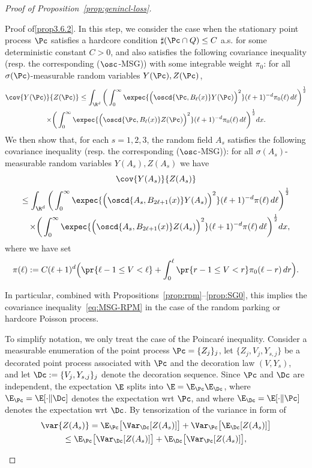 \begin{proof}[Proof of Proposition~\ref{prop:genincl-loss}]
\begin{step}{Proof of\eqref{prop3.6.2}.}\label{step2proofprop3.6}
In this step, we consider the case when the stationary point process $\Pc$ satisfies a hardcore condition $\sharp(\Pc\cap Q)\le C$ a.s. for some deterministic constant $C>0$, and also satisfies the following covariance inequality (resp. the corresponding ($\osc$-MSG)) with some integrable weight $\pi_0$: for all $\sigma(\Pc)$-measurable random variables $Y(\Pc),Z(\Pc)$,
\begin{multline}\label{eq:ass-ci-pc}
\cov{Y(\Pc)}{Z(\Pc)}\le \int_{\R^d}\bigg(\int_0^\infty\expec{\Big(\oscd{\Pc,B_{\ell}(x)}Y(\Pc)\Big)^2}(\ell+1)^{-d}\pi_0(\ell)\,d\ell\bigg)^\frac12\\
\times\bigg(\int_0^\infty\expec{\Big(\oscd{\Pc,B_{\ell}(x)}Z(\Pc)\Big)^2}(\ell+1)^{-d}\pi_0(\ell)\,d\ell\bigg)^\frac12dx.
\end{multline}
We then show that, for each $s=1,2,3$, the random field $A_s$ satisfies the following covariance inequality (resp. the corresponding ($\osc$-MSG)): for all $\sigma(A_s)$-measurable random variables $Y(A_s),Z(A_s)$ we have
\begin{multline}\label{eq:res-RPM-type-cov}
\cov{Y(A_s)}{Z(A_s)}\\
\begin{aligned}
\le \int_{\R^d}\bigg(\int_0^\infty\expec{\Big(\oscd{A_s,B_{2\ell+1}(x)}Y(A_s)\Big)^2}(\ell+1)^{-d}\pi(\ell)\,d\ell\bigg)^\frac12\\
\times\bigg(\int_0^\infty\expec{\Big(\oscd{A_s,B_{2\ell+1}(x)}Z(A_s)\Big)^2}(\ell+1)^{-d}\pi(\ell)\,d\ell\bigg)^\frac12dx,
\end{aligned}
\end{multline}
where we have set
\[
\pi(\ell):=C(\ell+1)^d\Big(\pr{\ell-1\le V<\ell}+\int_0^\ell \pr{r-1\le V<r}\pi_0(\ell-r)\,dr\Big).
\]


In particular, combined with Propositions~\ref{prop:rpm}--\ref{prop:SG0}, this implies the covariance inequality~\eqref{eq:MSG-RPM} in the case of the random parking or hardcore Poisson process.

\noindent To simplify notation, we only treat the case of the Poincaré inequality. Consider a measurable enumeration of the point process $\Pc=\{Z_j\}_j$, let $\{Z_j,V_j,Y_{s,j}\}$ be a decorated point process associated with $\Pc$ and the decoration law $(V,Y_s)$, and let $\Dc:=\{V_j,Y_{s,j}\}_j$ denote the decoration sequence. Since $\Pc$ and $\Dc$ are independent, the expectation $\E$ splits into $\E=\E_{\Pc}\E_{\Dc}$, where $\E_{\Pc}=\E[\cdot\|\Dc]$ denotes the expectation wrt $\Pc$, and where $\E_{\Dc}=\E[\cdot\|\Pc]$ denotes the expectation wrt $\Dc$. By tensorization of the variance in form of
\begin{multline*}
\var{Z(A_s)}=\E_{\Pc}\big[\Var_{\Dc}[Z(A_s)]\big]+\Var_{\Pc}\big[\E_{\Dc}[Z(A_s)]\big]\\
\le \E_{\Pc}\big[\Var_{\Dc}[Z(A_s)]\big]+\E_{\Dc}\big[\Var_{\Pc}[Z(A_s)]\big],
\end{multline*}


\end{step}
\end{proof}

